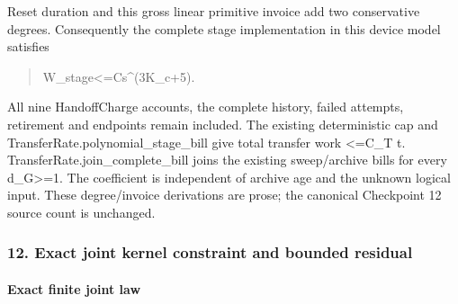 \documentclass[
]{article}
\begin{document}
Reset duration and this gross linear primitive invoice add two
conservative degrees. Consequently the complete stage implementation in
this device model satisfies

\begin{quote}\small\ttfamily\raggedright\setlength{\parskip}{0pt}
\noindent W\allowbreak{}\_\allowbreak{}s\allowbreak{}t\allowbreak{}a\allowbreak{}g\allowbreak{}e\allowbreak{}<\allowbreak{}=\allowbreak{}C\allowbreak{}\hspace*{0.525em}\allowbreak{}s\allowbreak{}\^{}\allowbreak{}(\allowbreak{}3\allowbreak{}K\allowbreak{}\_\allowbreak{}c\allowbreak{}+\allowbreak{}5\allowbreak{})\allowbreak{}.\par
\end{quote}

All nine HandoffCharge accounts, the complete history, failed attempts,
retirement and endpoints remain included. The existing deterministic cap
and
T\allowbreak{}r\allowbreak{}a\allowbreak{}n\allowbreak{}s\allowbreak{}f\allowbreak{}e\allowbreak{}r\allowbreak{}R\allowbreak{}a\allowbreak{}t\allowbreak{}e\allowbreak{}.\allowbreak{}p\allowbreak{}o\allowbreak{}l\allowbreak{}y\allowbreak{}n\allowbreak{}o\allowbreak{}m\allowbreak{}i\allowbreak{}a\allowbreak{}l\allowbreak{}\_\allowbreak{}s\allowbreak{}t\allowbreak{}a\allowbreak{}g\allowbreak{}e\allowbreak{}\_\allowbreak{}b\allowbreak{}i\allowbreak{}l\allowbreak{}l
give total transfer work \textless=C\_T t.
T\allowbreak{}r\allowbreak{}a\allowbreak{}n\allowbreak{}s\allowbreak{}f\allowbreak{}e\allowbreak{}r\allowbreak{}R\allowbreak{}a\allowbreak{}t\allowbreak{}e\allowbreak{}.\allowbreak{}j\allowbreak{}o\allowbreak{}i\allowbreak{}n\allowbreak{}\_\allowbreak{}c\allowbreak{}o\allowbreak{}m\allowbreak{}p\allowbreak{}l\allowbreak{}e\allowbreak{}t\allowbreak{}e\allowbreak{}\_\allowbreak{}b\allowbreak{}i\allowbreak{}l\allowbreak{}l
joins the existing sweep/archive bills for every d\_G\textgreater=1. The
coefficient is independent of archive age and the unknown logical input.
These degree/invoice derivations are prose; the canonical Checkpoint 12
source count is unchanged.

\subsubsection{12. Exact joint kernel constraint and bounded
residual}\label{exact-joint-kernel-constraint-and-bounded-residual}

\paragraph{Exact finite joint law}\label{exact-finite-joint-law}
\end{document}
